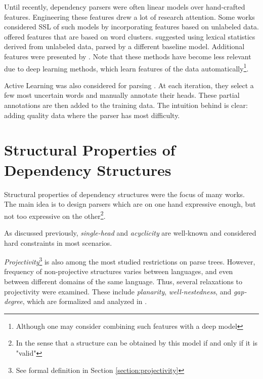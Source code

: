 Until recently, dependency parsers were often linear models over hand-crafted features. Engineering these features drew a lot of research attention. Some works considered SSL of such models by incorporating features based on unlabeled data. \cite{koo_simple_2008} offered features that are based on word clusters. \cite{kiperwasser_semi-supervised_2015} suggested using lexical statistics derived from unlabeled data, parsed by a different baseline model. Additional features were presented by \cite{suzuki_empirical_2009,chen_semi-supervised_2013}. Note that these methods have become less relevant due to deep learning methods, which learn features of the data automatically\footnote{Although one may consider combining such features with a deep model}.

Active Learning was also considered for parsing \cite{li_active_2016}. At each iteration, they select a few most uncertain words and manually annotate their heads. These partial annotations are then added to the training data. The intuition behind is clear: adding quality data where the parser has most difficulty. 


\section{Structural Properties of Dependency Structures}\label{sec:structural_props_parse}

Structural properties of dependency structures were the focus of many works. The main idea is to design parsers which are on one hand expressive enough, but not too expressive on the other\footnote{In the sense that a structure can be obtained by this model if and only if it is "valid"}.

As discussed previously, \textit{single-head} and \textit{acyclicity} are well-known and considered hard constraints in most scenarios. 

\textit{Projectivity}\footnote{See formal definition  in Section \ref{section:projectivity}} is also among the most studied restrictions on parse trees. However, frequency of non-projective structures varies between languages, and even between different domains of the same language. Thus, several relaxations to projectivity were examined. These include \textit{planarity}, \textit{well-nestedness}, and \textit{gap-degree}, which are formalized and analyzed in \cite{gomez-rodriguez_transition-based_2010,gomez-rodriguez_parsing_2009,havelka_beyond_2007,havelka_projectivity_2007,kuhlmann_dependency_2010}.

